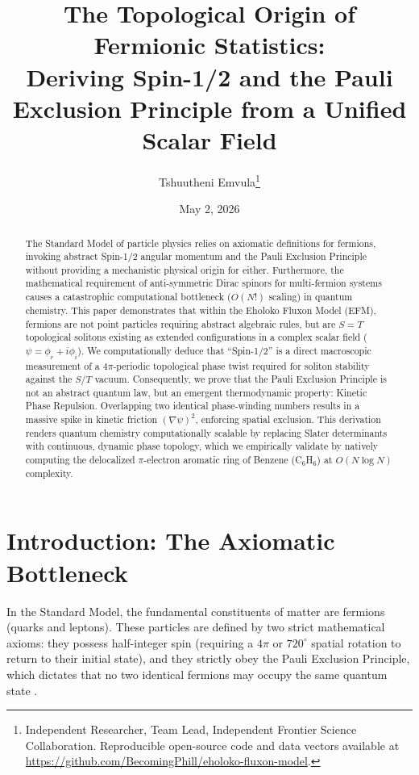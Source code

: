 \documentclass[11pt, twoside]{article}
\title{The Topological Origin of Fermionic Statistics: \\ \Large Deriving Spin-1/2 and the Pauli Exclusion Principle from a Unified Scalar Field}
\author{Tshuutheni Emvula\thanks{Independent Researcher, Team Lead, Independent Frontier Science Collaboration. Reproducible open-source code and data vectors available at \url{https://github.com/BecomingPhill/eholoko-fluxon-model}.}}
\date{May 2, 2026}
\begin{document}
\maketitle
\thispagestyle{empty}

\begin{abstract}
The Standard Model of particle physics relies on axiomatic definitions for fermions, invoking abstract Spin-1/2 angular momentum and the Pauli Exclusion Principle without providing a mechanistic physical origin for either. Furthermore, the mathematical requirement of anti-symmetric Dirac spinors for multi-fermion systems causes a catastrophic computational bottleneck ($O(N!)$ scaling) in quantum chemistry. This paper demonstrates that within the Eholoko Fluxon Model (EFM), fermions are not point particles requiring abstract algebraic rules, but are $S=T$ topological solitons existing as extended configurations in a complex scalar field ($\psi = \phi_r + i\phi_i$). We computationally deduce that ``Spin-1/2'' is a direct macroscopic measurement of a $4\pi$-periodic topological phase twist required for soliton stability against the $S/T$ vacuum. Consequently, we prove that the Pauli Exclusion Principle is not an abstract quantum law, but an emergent thermodynamic property: Kinetic Phase Repulsion. Overlapping two identical phase-winding numbers results in a massive spike in kinetic friction $(\nabla\psi)^2$, enforcing spatial exclusion. This derivation renders quantum chemistry computationally scalable by replacing Slater determinants with continuous, dynamic phase topology, which we empirically validate by natively computing the delocalized $\pi$-electron aromatic ring of Benzene (C$_6$H$_6$) at $O(N \log N)$ complexity.
\end{abstract}

\clearpage
\tableofcontents
\clearpage

\section{Introduction: The Axiomatic Bottleneck}

In the Standard Model, the fundamental constituents of matter are fermions (quarks and leptons). These particles are defined by two strict mathematical axioms: they possess half-integer spin (requiring a $4\pi$ or $720^\circ$ spatial rotation to return to their initial state), and they strictly obey the Pauli Exclusion Principle, which dictates that no two identical fermions may occupy the same quantum state \citep{griffiths2018}. 
\end{document}
